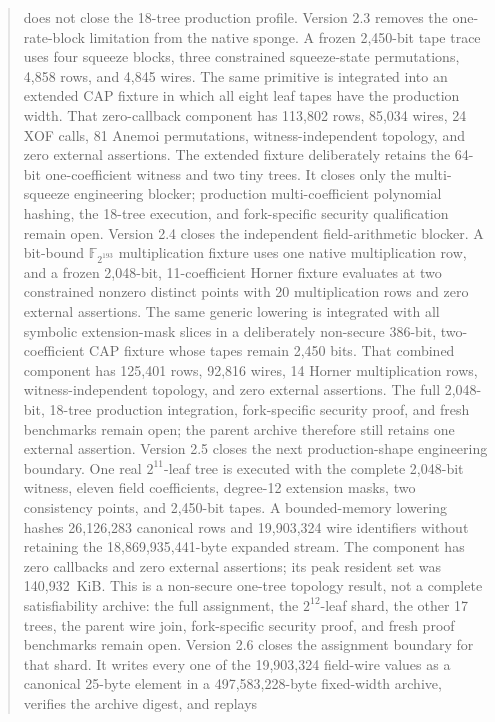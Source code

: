 \documentclass[11pt]{article}
\begin{document}
\begin{abstract}
does not close the 18-tree production profile.
Version 2.3 removes the one-rate-block limitation from the native sponge.  A
frozen 2,450-bit tape trace uses four squeeze blocks, three constrained
squeeze-state permutations, 4,858 rows, and 4,845 wires.  The same primitive
is integrated into an extended CAP fixture in which all eight leaf tapes have
the production width.  That zero-callback component has 113,802 rows, 85,034
wires, 24 XOF calls, 81 Anemoi permutations, witness-independent topology,
and zero external assertions.  The extended fixture deliberately retains the
64-bit one-coefficient witness and two tiny trees.  It closes only the
multi-squeeze engineering blocker; production multi-coefficient polynomial
hashing, the 18-tree execution, and fork-specific security qualification remain
open.
Version 2.4 closes the independent field-arithmetic blocker.  A bit-bound
$\mathbb F_{2^{193}}$ multiplication fixture uses one native multiplication
row, and a frozen 2,048-bit, 11-coefficient Horner fixture evaluates at two
constrained nonzero distinct points with 20 multiplication rows and zero
external assertions.  The same generic lowering is integrated with all
symbolic extension-mask slices in a deliberately non-secure 386-bit,
two-coefficient CAP fixture whose tapes remain 2,450 bits.  That combined
component has 125,401 rows, 92,816 wires, 14 Horner multiplication rows,
witness-independent topology, and zero external assertions.  The full
2,048-bit, 18-tree production integration, fork-specific security proof, and
fresh benchmarks remain open; the parent archive therefore still retains one
external assertion.
Version 2.5 closes the next production-shape engineering boundary.  One real
$2^{11}$-leaf tree is executed with the complete 2,048-bit witness, eleven
field coefficients, degree-12 extension masks, two consistency points, and
2,450-bit tapes.  A bounded-memory lowering hashes 26,126,283 canonical rows
and 19,903,324 wire identifiers without retaining the 18,869,935,441-byte
expanded stream.  The component has zero callbacks and zero external
assertions; its peak resident set was 140,932~KiB.  This is a non-secure
one-tree topology result, not a complete satisfiability archive: the full
assignment, the $2^{12}$-leaf shard, the other 17 trees, the parent wire join,
fork-specific security proof, and fresh proof benchmarks remain open.
Version 2.6 closes the assignment boundary for that shard.  It writes every
one of the 19,903,324 field-wire values as a canonical 25-byte element in a
497,583,228-byte fixed-width archive, verifies the archive digest, and replays

\end{abstract}
\end{document}

